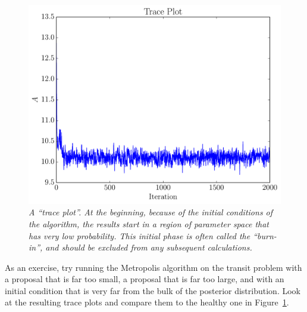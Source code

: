 \begin{figure}
\begin{center}
\includegraphics[scale=0.45]{trace_plot.pdf}
\caption{\it A ``trace plot''. At the beginning, because of the initial conditions
of the algorithm, the results start in a region of parameter space that has
very low probability. This initial phase is often called the ``burn-in'', and
should be excluded from any subsequent calculations.\label{fig:trace_plot}}
\end{center}
\end{figure}

As an exercise, try running the Metropolis algorithm on the transit problem
with a proposal that is far too small, a proposal that is far too large, and
with an initial condition that is very far from the bulk of the posterior
distribution. Look at the resulting trace plots and
compare them to the healthy one in Figure~\ref{fig:trace_plot}.

